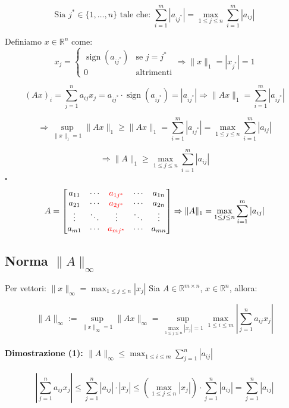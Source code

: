 \documentclass[12pt,a4paper]{article}
\begin{document}
\[\text{Sia }j^* \in \{1, \dots, n\} \text{ tale che: }\sum_{i=1}^m |a_{i j^*}| = \max_{1 \le j \le n} \sum_{i=1}^m |a_{ij}|
\]

Definiamo $x \in \mathbb{R}^n$ come:
\[
x_j = \begin{cases}
\operatorname{sign}(a_{i j^*}) & \text{se } j = j^* \\
0 & \text{altrimenti}
\end{cases}
\Rightarrow \|x\|_1 = |x_{j^*}| = 1
\]

\[
(Ax)_i = \sum_{j=1}^n a_{ij} x_j = a_{i j^*} \cdot \operatorname{sign}(a_{i j^*})
= |a_{i j^*}| \Rightarrow \|Ax\|_1 = \sum_{i=1}^m |a_{i j^*}|
\]

\[
\Rightarrow \sup_{\|x\|_1 = 1} \|Ax\|_1 \ge \|Ax\|_1 = \sum_{i=1}^m |a_{i j^*}|
= \max_{1 \le j \le n} \sum_{i=1}^m |a_{ij}|
\]

\[
\Rightarrow \|A\|_1 \ge \max_{1 \le j \le n} \sum_{i=1}^m |a_{ij}|
\]
\hfill $\square$
\[
A =
\begin{bmatrix}
a_{11} & \cdots & \color{red}{a_{1j^*}} & \cdots & a_{1n} \\
a_{21} & \cdots & \color{red}{a_{2j^*}} & \cdots & a_{2n} \\
\vdots & \ddots & \vdots & \ddots & \vdots \\
a_{m1} & \cdots & \color{red}{a_{mj^*}} & \cdots & a_{mn}
\end{bmatrix}\Rightarrow \|A\|_1 = \max_{1 \le j \le n} \sum_{i=1}^m |a_{ij}|
\]

\subsection*{Norma $\|A\|_\infty$}

Per vettori: $\|x\|_\infty = \max_{1 \le j \le n} |x_j|$  
Sia $A \in \mathbb{R}^{m \times n}$, $x \in \mathbb{R}^n$, allora:

\[
\|A\|_\infty := \sup_{\|x\|_\infty = 1} \|Ax\|_\infty = \sup_{\max_{1 \le j \le n} |x_j| = 1} \max_{1 \le i \le m} \left| \sum_{j=1}^n a_{ij} x_j \right|
\]

\paragraph{Dimostrazione (1): $\|A\|_\infty \le \max_{1 \le i \le m} \sum_{j=1}^n |a_{ij}|$}

\[
\left| \sum_{j=1}^n a_{ij} x_j \right| \le \sum_{j=1}^n |a_{ij}| \cdot |x_j|
\le \left( \max_{1 \le j \le n} |x_j| \right) \cdot \sum_{j=1}^n |a_{ij}| = \sum_{j=1}^n |a_{ij}|
\]
\end{document}
